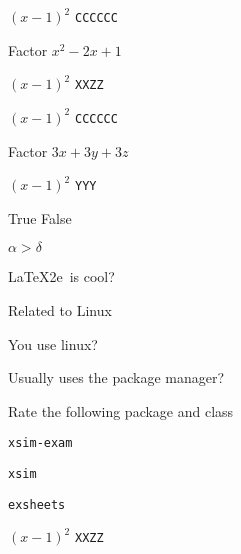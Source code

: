 \documentclass{article}
\begin{document}
    \begin{scontents}[store-env=simplews]
    $\left(x-1\right)^{2}$ \verb+CCCCCC+
    \end{scontents}


\begin{enumext}[save-ans=simplews,columns=2,align=left,check-ans=true,show-ans=true,nosep,save-ref=true,wrap-label={\tikz[scale=0.25]\duck[signpost=\scalebox{0.6}{#1}];}]
  \item Factor $x^{2}-2x+1$
    \begin{anskey*}
    $\left(x-1\right)^{2}$ \verb+XXZZ+
    \end{anskey*}

            \begin{scontents}[store-env=simple,print-env=true]
          $\left(x-1\right)^{2}$ \verb+CCCCCC+
        \end{scontents}

  \item Factor $3x+3y+3z$
    \begin{anskey*}
    $\left(x-1\right)^{2}$ \verb+YYY+
    \end{anskey*}
  \item True False
    \begin{enumext*}[nosep]
      \item $\alpha > \delta$ 
      \item \LaTeX2e\ is cool? 
    \end{enumext*}
  \item Related to Linux
    \begin{enumext}[nosep]
      \item You use linux? 
      \item Usually uses the package manager? 
      \item Rate the following package and class
        \begin{enumext*}[nosep]
          \item \texttt{xsim-exam} 
          \item \texttt{xsim} 
          \item \texttt{exsheets}
          \begin{anskey*}
    $\left(x-1\right)^{2}$ \verb+XXZZ+
    \end{anskey*}
        \end{enumext*}
    \end{enumext}
\end{enumext}
\end{document}
